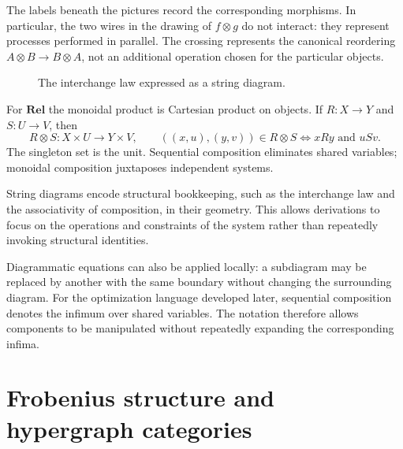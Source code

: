 The labels beneath the pictures record the corresponding morphisms.  In
particular, the two wires in the drawing of $f\otimes g$ do not interact: they
represent processes performed in parallel.  The crossing represents the
canonical reordering $A\otimes B\to B\otimes A$, not an additional operation
chosen for the particular objects.

\begin{figure}[H]
    \centering
{}
\caption{The interchange law expressed as a string diagram.}
\label{fig:appendix-interchange}
\end{figure}

For $\mathbf{Rel}$ the monoidal product is Cartesian product on objects.  If
$R:X\to Y$ and $S:U\to V$, then
\[
 R\otimes S:X\times U\longrightarrow Y\times V,
 \qquad
 ((x,u),(y,v))\in R\otimes S
 \Longleftrightarrow xRy\text{ and }uSv.
\]
The singleton set is the unit.  Sequential composition eliminates shared
variables; monoidal composition juxtaposes independent systems.

String diagrams encode structural bookkeeping, such as the interchange law
and the associativity of composition, in their geometry. This allows derivations
to focus on the operations and constraints of the system rather than repeatedly
invoking structural identities.

Diagrammatic equations can also be applied locally: a subdiagram may be replaced
by another with the same boundary without changing the surrounding diagram.
For the optimization language developed later, sequential composition denotes
the infimum over shared variables. The notation therefore allows components
to be manipulated without repeatedly expanding the corresponding infima.

\section{Frobenius structure and hypergraph categories}\label{sec:main-hypergraph}

